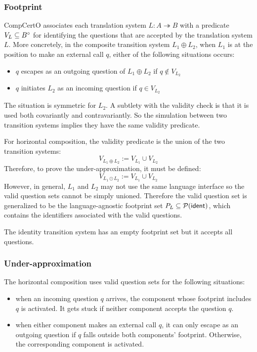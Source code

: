 \subsubsection{Footprint}

CompCertO associates each translation system $L: A \twoheadrightarrow B$ with a
predicate $V_L \subseteq B^\circ$ for identifying the questions that are accepted
by the translation system $L$. More concretely, in the composite transition
system $L_1 \oplus L_2$, when $L_1$ is at the position to make an external call
$q$, either of the following situations occurs:
\begin{itemize}
  \item $q$ escapes as an outgoing question of $L_1 \oplus L_2$ if $q \notin V_{L_2}$
  \item $q$ initiates $L_2$ as an incoming question if $q \in V_{L_2}$
\end{itemize}
The situation is symmetric for $L_2$. A subtlety with the validity check is that
it is used both covariantly and contravariantly. So the simulation between two
transition systems implies they have the same validity predicate.

For horizontal composition, the validity predicate is the union of the two
transition systems:
\[
  V_{L_1 \oplus L_2} := V_{L_1} \cup V_{L_2}
\]
Therefore, to prove the under-approximation, it must be defined:
\[
  V_{L_1 \odot L_2} := V_{L_1} \cup V_{L_2}
\]
However, in general, $L_1$ and $L_2$ may not use the same language interface so
the valid question sets cannot be simply unioned. Therefore the
valid question set is generalized to be the language-agnostic footprint set $P_L \subseteq
\mathcal{P}( \mathsf{ident} )$, which contains the identifiers associated with the
valid questions.

The identity transition system has an empty footprint set but it accepts all
questions.

\subsubsection{Under-approximation}

The horizontal composition uses valid question sets for the following situations:
\begin{itemize}
  \item when an incoming question $q$ arrives, the component whose footprint
    includes $q$ is activated. It gets stuck if neither component accepts the
    question $q$.
  \item when either component makes an external call $q$, it can only escape as
    an outgoing question if $q$ falls outside both components' footprint.
    Otherwise, the corresponding component is activated.
\end{itemize}

